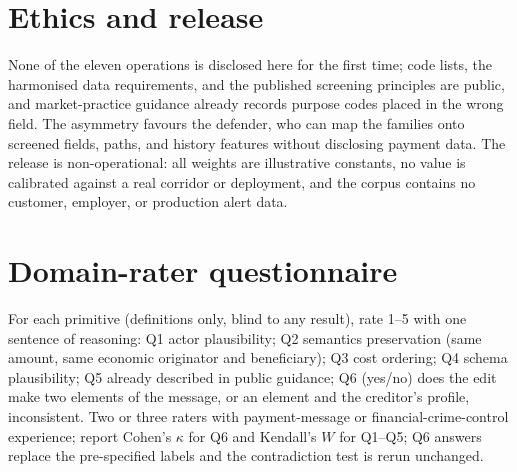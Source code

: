 \documentclass[conference]{IEEEtran}
\begin{document}
\section{Ethics and release}
None of the eleven operations is disclosed here for the first time; code
lists, the harmonised data requirements, and the published screening
principles are public, and market-practice guidance already records purpose
codes placed in the wrong field. The asymmetry favours the defender, who can
map the families onto screened fields, paths, and history features without
disclosing payment data. The release is non-operational: all weights are
illustrative constants, no value is calibrated against a real corridor or
deployment, and the corpus contains no customer, employer, or production
alert data.

\section{Domain-rater questionnaire}
For each primitive (definitions only, blind to any result), rate 1--5 with
one sentence of reasoning: Q1 actor plausibility; Q2 semantics preservation
(same amount, same economic originator and beneficiary); Q3 cost ordering;
Q4 schema plausibility; Q5 already described in public guidance; Q6 (yes/no)
does the edit make two elements of the message, or an element and the
creditor's profile, inconsistent. Two or three raters with payment-message
or financial-crime-control experience; report Cohen's $\kappa$ for Q6 and
Kendall's $W$ for Q1--Q5; Q6 answers replace the pre-specified labels and
the contradiction test is rerun unchanged.
\end{document}
